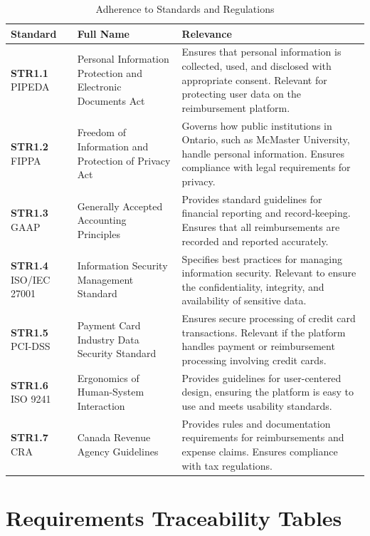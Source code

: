 \documentclass[12pt]{article}
\begin{document}
\begin{table}[h]
    \centering
    \begin{tabular}{|>{\raggedright}p{3cm}|>{\raggedright}p{5cm}|>{\raggedright\arraybackslash}p{6.5cm}|}
        \hline
        \textbf{Standard} & \textbf{Full Name} & \textbf{Relevance} \\
        \hline
        \textbf{STR1.1} PIPEDA & Personal Information Protection and Electronic Documents Act & Ensures that personal information is collected, used, and disclosed with appropriate consent. Relevant for protecting user data on the reimbursement platform. \\
        \hline
        \textbf{STR1.2} FIPPA & Freedom of Information and Protection of Privacy Act & Governs how public institutions in Ontario, such as McMaster University, handle personal information. Ensures compliance with legal requirements for privacy. \\
        \hline
        \textbf{STR1.3} GAAP & Generally Accepted Accounting Principles & Provides standard guidelines for financial reporting and record-keeping. Ensures that all reimbursements are recorded and reported accurately. \\
        \hline
        \textbf{STR1.4} ISO/IEC 27001 & Information Security Management Standard & Specifies best practices for managing information security. Relevant to ensure the confidentiality, integrity, and availability of sensitive data. \\
        \hline
        \textbf{STR1.5} PCI-DSS & Payment Card Industry Data Security Standard & Ensures secure processing of credit card transactions. Relevant if the platform handles payment or reimbursement processing involving credit cards. \\
        \hline
        \textbf{STR1.6} ISO 9241 & Ergonomics of Human-System Interaction & Provides guidelines for user-centered design, ensuring the platform is easy to use and meets usability standards. \\
        \hline
        \textbf{STR1.7} CRA & Canada Revenue Agency Guidelines & Provides rules and documentation requirements for reimbursements and expense claims. Ensures compliance with tax regulations. \\
        \hline
    \end{tabular}
    \caption{Adherence to Standards and Regulations}
    \label{tab:standards}
\end{table}

\section{Requirements Traceability Tables}
\end{document}
